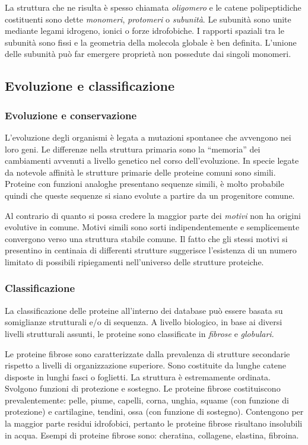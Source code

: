 {{La struttura che ne risulta è spesso chiamata \textit{oligomero} e le catene polipeptidiche costituenti sono dette \textit{monomeri}, \textit{protomeri} o \textit{subunità}. Le subunità sono unite mediante legami idrogeno, ionici o forze idrofobiche. I rapporti spaziali tra le subunità sono fissi e la geometria della molecola globale è ben definita.
L'unione delle subunità può far emergere proprietà non possedute dai singoli monomeri.
}
\subsection{Evoluzione e classificazione}
{
\subsubsection{Evoluzione e conservazione}
L’evoluzione degli organismi è legata a mutazioni spontanee che avvengono nei loro geni. Le differenze nella struttura primaria sono la “memoria” dei cambiamenti avvenuti a livello genetico nel corso dell’evoluzione. In specie legate da notevole affinità le strutture primarie delle proteine comuni sono
simili. Proteine con funzioni analoghe presentano sequenze simili, è molto probabile quindi che queste sequenze si siano evolute a partire da un progenitore comune. 

\par Al contrario di quanto si possa credere la maggior parte dei \textit{motivi} non ha origini evolutive in comune. Motivi simili sono sorti indipendentemente e semplicemente convergono verso una struttura stabile comune. Il fatto che gli stessi motivi si presentino in centinaia di differenti strutture suggerisce l'esistenza di un numero limitato di possibili ripiegamenti nell'universo delle strutture proteiche\supercite{proteinMotifs}. 

\subsubsection{Classificazione} \label{sec:classificazione}
La classificazione delle proteine all'interno dei database può essere basata su somiglianze strutturali e/o di sequenza. A livello biologico, in base ai diversi livelli strutturali assunti, le proteine sono classificate in \textit{fibrose} e \textit{globulari}.

\par Le proteine fibrose sono caratterizzate dalla prevalenza di strutture secondarie rispetto a livelli di organizzazione superiore. Sono costituite da lunghe catene disposte in lunghi fasci o foglietti. La struttura è estremamente ordinata. Svolgono funzioni di protezione e sostegno. Le proteine fibrose costituiscono prevalentemente: pelle, piume, capelli, corna, unghia, squame (con funzione di protezione) e cartilagine, tendini, ossa (con funzione di sostegno). Contengono per la maggior parte residui idrofobici, pertanto le proteine fibrose risultano insolubili in acqua. Esempi di proteine fibrose sono: cheratina, collagene, elastina, fibroina. 

}}
